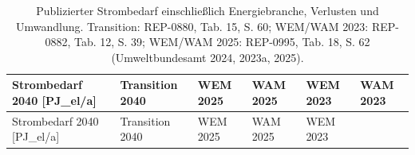 \documentclass[
  ngerman,
  a4paper,
  DIV=11]{scrreprt}
\begin{document}
\begin{longtable}[]{@{}
  >{\raggedright\arraybackslash}p{}
  >{\raggedleft\arraybackslash}p{}
  >{\raggedleft\arraybackslash}p{}
  >{\raggedleft\arraybackslash}p{}
  >{\raggedleft\arraybackslash}p{}
  >{\raggedleft\arraybackslash}p{}@{}}
\caption{Publizierter Strombedarf einschließlich Energiebranche,
Verlusten und Umwandlung. Transition: REP-0880, Tab. 15, S. 60; WEM/WAM
2023: REP-0882, Tab. 12, S. 39; WEM/WAM 2025: REP-0995, Tab. 18, S. 62
(Umweltbundesamt 2024, 2023a,
2025).}\label{tbl-allokation-strombedarf-2040}\tabularnewline
\toprule\noalign{}
\begin{minipage}[b]{\linewidth}\raggedright
Strombedarf 2040 {[}PJ\_el/a{]}
\end{minipage} & \begin{minipage}[b]{\linewidth}\raggedleft
Transition 2040
\end{minipage} & \begin{minipage}[b]{\linewidth}\raggedleft
WEM 2025
\end{minipage} & \begin{minipage}[b]{\linewidth}\raggedleft
WAM 2025
\end{minipage} & \begin{minipage}[b]{\linewidth}\raggedleft
WEM 2023
\end{minipage} & \begin{minipage}[b]{\linewidth}\raggedleft
WAM 2023
\end{minipage} \\
\midrule\noalign{}
\endfirsthead
\toprule\noalign{}
\begin{minipage}[b]{\linewidth}\raggedright
Strombedarf 2040 {[}PJ\_el/a{]}
\end{minipage} & \begin{minipage}[b]{\linewidth}\raggedleft
Transition 2040
\end{minipage} & \begin{minipage}[b]{\linewidth}\raggedleft
WEM 2025
\end{minipage} & \begin{minipage}[b]{\linewidth}\raggedleft
WAM 2025
\end{minipage} & \begin{minipage}[b]{\linewidth}\raggedleft
WEM 2023
\end{minipage} & \begin{minipage}[b]{\linewidth}\raggedleft

\end{minipage}
\end{longtable}
\end{document}
